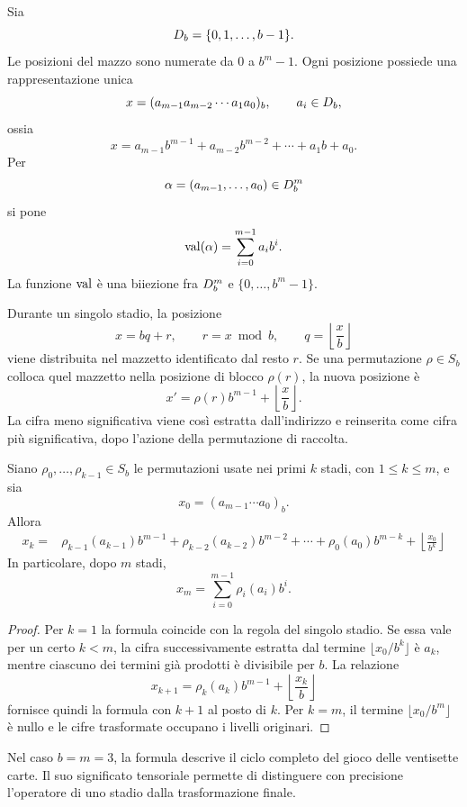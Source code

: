 	Sia
	\[
	D_b=\{0,1,\dots,b-1\}.
	\]
	Le posizioni del mazzo sono numerate da \(0\) a \(b^m-1\). Ogni posizione
	possiede una rappresentazione unica
	\[
	x=(a_{m-1}a_{m-2}\cdots a_1a_0)_b,
	\qquad
	a_i\in D_b,
	\]
	ossia
	\[
	x=a_{m-1}b^{m-1}+a_{m-2}b^{m-2}+\cdots+a_1b+a_0.
	\]
	Per
	\[
	\alpha=(a_{m-1},\dots,a_0)\in D_b^m
	\]
	si pone
	\[
	\operatorname{val}(\alpha)
	=
	\sum_{i=0}^{m-1}a_i b^i.
	\]
	La funzione \(\operatorname{val}\) è una biiezione fra \(D_b^m\) e
	\(\{0,\dots,b^m-1\}\).

	Durante un singolo stadio, la posizione
	\[
	x=bq+r,
	\qquad
	r=x\bmod b,
	\qquad
	q=\left\lfloor\frac{x}{b}\right\rfloor
	\]
	viene distribuita nel mazzetto identificato dal resto \(r\). Se una
	permutazione \(\rho\in S_b\) colloca quel mazzetto nella posizione di blocco
	\(\rho(r)\), la nuova posizione è
	\[
	x'
	=
	\rho(r)b^{m-1}
	+
	\left\lfloor\frac{x}{b}\right\rfloor.
	\]
	La cifra meno significativa viene così estratta dall'indirizzo e reinserita
	come cifra più significativa, dopo l'azione della permutazione di raccolta.

	\begin{proposition}
		Siano \(\rho_0,\dots,\rho_{k-1}\in S_b\) le permutazioni usate nei primi
		\(k\) stadi, con \(1\le k\le m\), e sia
		\[
		x_0=(a_{m-1}\cdots a_0)_b.
		\]
		Allora
		\[
		\begin{aligned}
			x_k
			={}&
			\rho_{k-1}(a_{k-1})b^{m-1}
			+\rho_{k-2}(a_{k-2})b^{m-2}
			+\cdots
			+\rho_0(a_0)b^{m-k}
			+\left\lfloor\frac{x_0}{b^k}\right\rfloor
		\end{aligned}
		\]
		In particolare, dopo \(m\) stadi,
		\[
		x_m
		=
		\sum_{i=0}^{m-1}\rho_i(a_i)b^i.
		\]
	\end{proposition}

	\begin{proof}
		Per \(k=1\) la formula coincide con la regola del singolo stadio. Se essa
		vale per un certo \(k<m\), la cifra successivamente estratta dal termine
		\(\lfloor x_0/b^k\rfloor\) è \(a_k\), mentre ciascuno dei termini già
		prodotti è divisibile per \(b\). La relazione
		\[
		x_{k+1}
		=
		\rho_k(a_k)b^{m-1}
		+
		\left\lfloor\frac{x_k}{b}\right\rfloor
		\]
		fornisce quindi la formula con \(k+1\) al posto di \(k\). Per \(k=m\), il
		termine \(\lfloor x_0/b^m\rfloor\) è nullo e le cifre trasformate occupano i
		livelli originari.
	\end{proof}

	Nel caso \(b=m=3\), la formula descrive il ciclo completo del gioco delle
	ventisette carte. Il suo significato tensoriale permette di distinguere con
	precisione l'operatore di uno stadio dalla trasformazione finale.

